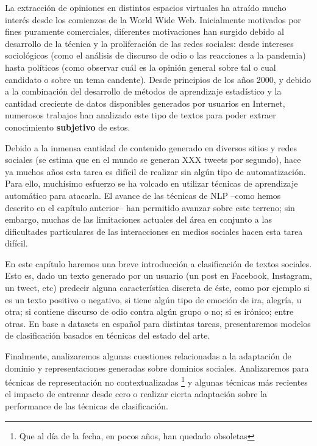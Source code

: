\label{chap:03_social_text_classification}

La extracción de opiniones en distintos espacios virtuales ha atraído mucho interés desde los comienzos de la World Wide Web. Inicialmente motivados por fines puramente comerciales, diferentes motivaciones han surgido debido al desarrollo de la técnica y la proliferación de las redes sociales: desde intereses sociológicos (como el análisis de discurso de odio o las reacciones a la pandemia) hasta políticos (como observar cuál es la opinión general sobre tal o cual candidato o sobre un tema candente). Desde principios de los años 2000, y debido a la combinación del desarrollo de métodos de aprendizaje estadístico y la cantidad creciente de datos disponibles generados por usuarios en Internet, numerosos trabajos han analizado este tipo de textos para poder extraer conocimiento \textbf{subjetivo} de estos.

Debido a la inmensa cantidad de contenido generado en diversos sitios y redes sociales (se estima que en el mundo se generan XXX tweets por segundo), hace ya muchos años esta tarea es difícil de realizar sin algún tipo de automatización. Para ello, muchísimo esfuerzo se ha volcado en utilizar técnicas de aprendizaje automático para atacarla. El avance de las técnicas de NLP --como hemos descrito en el capítulo anterior-- han permitido avanzar sobre este terreno; sin embargo, muchas de las limitaciones actuales del área  en conjunto a las dificultades particulares de las interacciones en medios sociales hacen esta tarea difícil.

En este capítulo haremos una breve introducción a clasificación de textos sociales. Esto es, dado un texto generado por un usuario (un post en Facebook, Instagram, un tweet, etc) predecir alguna característica discreta de éste, como por ejemplo si es un texto positivo o negativo, si tiene algún tipo de emoción de ira, alegría, u otra; si contiene discurso de odio contra algún grupo o no; si es irónico; entre otras. En base a datasets en español para distintas tareas, presentaremos modelos de clasificación basados en técnicas del estado del arte.

Finalmente, analizaremos algunas cuestiones relacionadas a la adaptación de dominio y representaciones generadas sobre dominios sociales. Analizaremos para técnicas de representación no contextualizadas \footnote{Que al día de la fecha, en pocos años, han quedado obsoletas} y algunas técnicas más recientes el impacto de entrenar desde cero o realizar cierta adaptación sobre la performance de las técnicas de clasificación.


